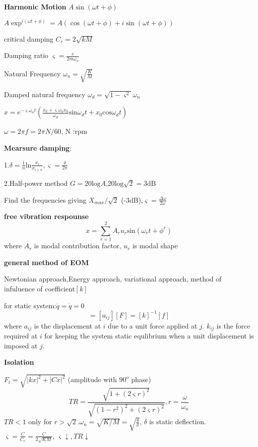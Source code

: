 \documentclass{article}
\begin{document}
\thispagestyle{empty}
\begin{multicols*}{3}

  \noindent\textbf{Harmonic Motion}
 $A \sin(\omega t + \phi)$

$A \exp^{i(\omega t + \phi)} = A(\cos(\omega t + \phi) + i\sin(\omega t + \phi))$

critical damping $C_{c}=2\sqrt{kM}$

Damping ratio $\varsigma=\frac{c}{2m\omega_{n}}$

Natural Frequency $\omega_{n}=\sqrt{\frac{K}{M}}$

Damped natural frequency $\omega_{d}=\sqrt{1-\varsigma^{2}}\omega_{n}$

$x=e^{-\varsigma \omega_{n}t}(\frac{\dot{x}_{0}+\varsigma \omega_{n}x_{0}}{\omega_{d}}\text{sin}\omega_{d}t+x_{0}\text{cos}\omega_{d}t)$

$\omega=2\pi f=2\pi N/60$, N :rpm

\textbf{Mearsure damping}: 

1.$\delta=\frac{1}{n}\text{ln}\frac{x_{i}}{x_{i+n}}, \varsigma =\frac{\delta}{2\pi}$

2.Half-power method $G=20\text{log}A$,$20\text{log}\sqrt{2}=3\text{dB}$

Find the frequencies giving $X_{max}/\sqrt{2}$ (-3dB),$\varsigma =\frac{\Delta \omega}{2\omega}$

\textbf{free vibration respounse}
\begin{equation*}
  {x}=\sum_{r=1}^{2}A_{r}u_{r}\text{sin}(\omega_{r}t+\phi^{r})
\end{equation*}
where $A_{r}$ is modal contribution factor, $u_{r}$ is modal shape

\textbf{general method of EOM}

Newtonian approach,Energy approach, variational approach,
method of infuluence of coefficient$[k]$

for static system:$\ddot{q}=\dot{q}=0$
\begin{equation*}
  [q]=[a_{ij}][F]=[k]^{-1}[f]
\end{equation*}
where $a_{ij}$ is the displacement at $i$ due to a unit force applied at $j$.
$k_{ij}$ is the force required at $i$ for keeping the system static equlibrium when a unit displacement is imposed at $j$.

\textbf{Isolation}

$F_{t}=\sqrt{|kx|^{2}+|C\dot{x}|^{2}}$ (amplitude with $90^{o}$ phase)
\begin{equation*}
  TR=\frac{\sqrt{1+(2\varsigma r)^{2}}}{\sqrt{(1-r^{2})^{2}+(2\varsigma r)^{2}}}, r=\frac{\omega}{\omega_{n}}
\end{equation*}
$TR<1$ only for $r> \sqrt{2}$.$\omega_{n}=\sqrt{K/M}=\sqrt{\frac{g}{\delta}}$, $\delta$ is static deflection.
$\varsigma=\frac{C}{C_{c}}=\frac{C}{2\sqrt{KM}}$, $\varsigma \downarrow, TR \downarrow$


\end{multicols*}
\end{document}

